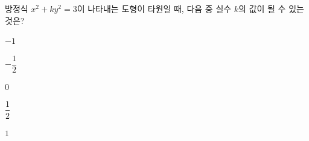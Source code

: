 방정식 $x^2+ky^2=3$이 나타내는 도형이 타원일 때, 다음 중 실수 $k$의 값이 될 수 있는 것은?
\begin{choices32}{\rule[-3ex]{0pt}{8ex}$-1$}{\rule[-3ex]{0pt}{8ex}$-\dfrac{1}{2}$}{\rule[-3ex]{0pt}{8ex}$0$}{\rule[-3ex]{0pt}{8ex}$\dfrac{1}{2}$}{\rule[-3ex]{0pt}{8ex}$1$}\end{choices32}
